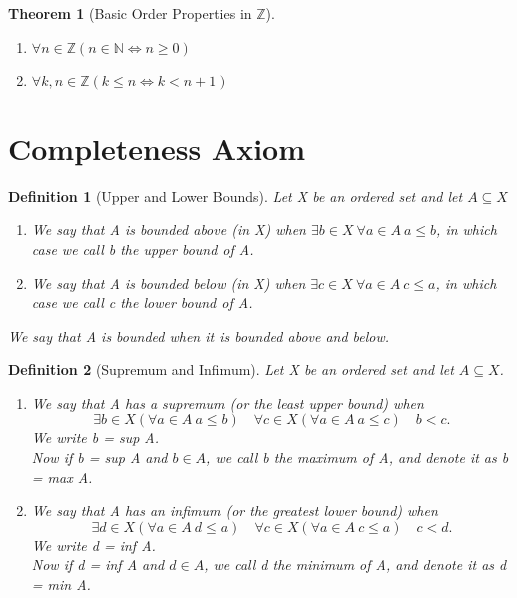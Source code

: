 \documentclass[11pt, oneside]{book}
\theoremstyle{break}
\newtheorem{thm}{Theorem}[section]
\newtheorem{defn}{Definition}[section]
\newcommand{\bb}[1]{\mathbb{#1}}			%
\begin{document}
\begin{thm}[Basic Order Properties in $\bb{Z}$]
	\begin{enumerate}
		\item $\forall n \in \bb{Z} (n \in \bb{N} \iff n \geq 0)$
		\item $\forall k, n \in \bb{Z} (k \leq n \iff k < n + 1)$
	\end{enumerate}
\end{thm}


\section{Completeness Axiom}

\begin{defn}[Upper and Lower Bounds]
	Let X be an ordered set and let $A \subseteq X$
	\begin{enumerate}
		\item We say that A is bounded above (in X) when $\exists b \in X \> \forall a \in A \> a \leq b$, in which case we call b the upper bound of A.
		\item We say that A is bounded below (in X) when $\exists c \in X \> \forall a \in A \> c \leq a$, in which case we call c the lower bound of A.
	\end{enumerate}
	We say that A is bounded when it is bounded above and below.
\end{defn}

\begin{defn}[Supremum and Infimum]
	Let X be an ordered set and let $A \subseteq X$.
	\begin{enumerate}
		\item We say that A has a supremum (or the least upper bound) when
			\[
				\exists b \in X (\forall a \in A \> a \leq b) \quad \forall c \in X (\forall a \in A \> a \leq c) \quad b < c.
			\]
			We write b = sup A. \\
			Now if b = sup A and $b \in A$, we call b the maximum of A, and denote it as b = max A. \\
		\item We say that A has an infimum (or the greatest lower bound) when
			\[
				\exists d \in X (\forall a \in A \> d \leq a) \quad \forall c \in X (\forall a \in A \> c \leq a) \quad c < d.
			\]
			We write d = inf A. \\
			Now if d = inf A and $d \in A$, we call d the minimum of A, and denote it as d = min A.
	\end{enumerate}
\end{defn}
\end{document}

